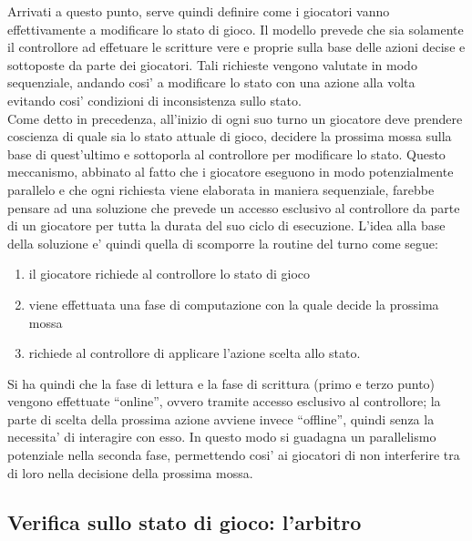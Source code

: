 Arrivati a questo punto, serve quindi definire come i giocatori vanno effettivamente a modificare lo stato di gioco. Il modello prevede che sia solamente il controllore ad effetuare le scritture vere e proprie sulla base delle azioni decise e sottoposte da parte dei giocatori. Tali richieste vengono valutate in modo sequenziale, andando cosi' a modificare lo stato con una azione alla volta evitando cosi' condizioni di inconsistenza sullo stato.\\

Come detto in precedenza, all'inizio di ogni suo turno un giocatore deve prendere coscienza di quale sia lo stato attuale di gioco, decidere la prossima mossa sulla base di quest'ultimo e sottoporla al controllore per modificare lo stato. Questo meccanismo, abbinato al fatto che i giocatore eseguono in modo potenzialmente parallelo e che ogni richiesta viene elaborata in maniera sequenziale, farebbe pensare ad una soluzione che prevede un accesso esclusivo al controllore da parte di un giocatore per tutta la durata del suo ciclo di esecuzione. L'idea alla base della soluzione e' quindi quella di scomporre la routine del turno come segue:\\

\begin{enumerate}
	\item il giocatore richiede al controllore lo stato di gioco
	\item viene effettuata una fase di computazione con la quale decide la prossima mossa
	\item richiede al controllore di applicare l'azione scelta allo stato.
\end{enumerate}

Si ha quindi che la fase di lettura e la fase di scrittura (primo e terzo punto) vengono effettuate “online”, ovvero tramite accesso esclusivo al controllore; la parte di scelta della prossima azione avviene invece “offline”, quindi senza la necessita' di interagire con esso. In questo modo si guadagna un parallelismo potenziale nella seconda fase, permettendo cosi' ai giocatori di non interferire tra di loro nella decisione della prossima mossa.

\subsection*{Verifica sullo stato di gioco: l'arbitro}
%
\label{sec:modello_verifica_arbitro}

